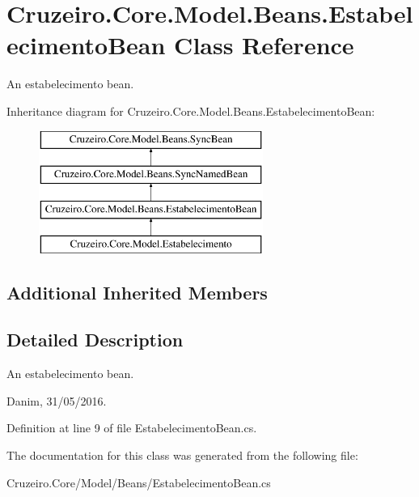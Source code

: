 \hypertarget{class_cruzeiro_1_1_core_1_1_model_1_1_beans_1_1_estabelecimento_bean}{}\section{Cruzeiro.\+Core.\+Model.\+Beans.\+Estabelecimento\+Bean Class Reference}
\label{class_cruzeiro_1_1_core_1_1_model_1_1_beans_1_1_estabelecimento_bean}


An estabelecimento bean.  


Inheritance diagram for Cruzeiro.\+Core.\+Model.\+Beans.\+Estabelecimento\+Bean\+:\begin{figure}[H]
\begin{center}
\leavevmode
\includegraphics[height=4.000000cm]{class_cruzeiro_1_1_core_1_1_model_1_1_beans_1_1_estabelecimento_bean}
\end{center}
\end{figure}
\subsection*{Additional Inherited Members}


\subsection{Detailed Description}
An estabelecimento bean. 

Danim, 31/05/2016. 

Definition at line 9 of file Estabelecimento\+Bean.\+cs.



The documentation for this class was generated from the following file\+:\begin{DoxyCompactItemize}
\item 
Cruzeiro.\+Core/\+Model/\+Beans/Estabelecimento\+Bean.\+cs\end{DoxyCompactItemize}
